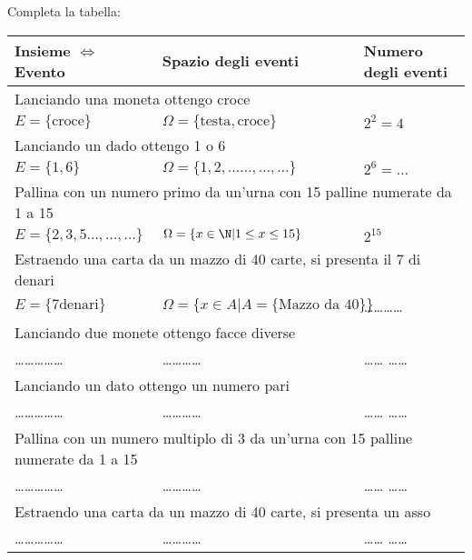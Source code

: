 \begin{esercizio}
 \label{ese:9.3}
Completa la tabella:
\begin{center}
\begin{tabular}{lll}
Insieme \(\Leftrightarrow\) Evento & Spazio degli eventi & Numero degli eventi\\
\midrule
\multicolumn{3}{l}{Lanciando una moneta ottengo croce}\\
\( E=\{\text{croce}\} \) & \( \Omega =\{\text{testa},\text{croce}\} \) & \( 2^2=4 \)\\
\midrule
\multicolumn{3}{l}{Lanciando un dado ottengo 1 o 6} \\
\( E=\{1,6\} \) & \( \Omega =\{1,2,\ldots \ldots, \ldots, \ldots\} \) & \( 2^6=\ldots 
\)\\
\midrule
\multicolumn{3}{l}{Pallina con un numero primo da un'urna con 15 palline 
numerate da 1 a 15}\\
\( E=\{2,3,5\ldots,\ldots,\ldots\} \) & \( \Omega =\{x\in \N| 1\le x\le 15\} 
\) & 
\( 2^{15} \)\\
\midrule
\multicolumn{3}{l}{Estraendo una carta da un mazzo di 40 carte, si presenta il 7 
di denari}\\
\( E=\{7\text{denari}\} \) & \( \Omega =\{x\in A| A=\{\text{Mazzo da 40}\}\} \) & 
\ldots\ldots\ldots\ldots\\
\midrule
\multicolumn{3}{l}{Lanciando due monete ottengo facce diverse}\\
\ldots \ldots \ldots \ldots \ldots & \ldots \ldots \ldots \ldots & \ldots \ldots 
\ldots \ldots\\
\midrule
\multicolumn{3}{l}{Lanciando un dato ottengo un numero pari}\\
\ldots \ldots \ldots \ldots \ldots & \ldots \ldots \ldots \ldots & \ldots \ldots 
\ldots \ldots\\
\midrule
\multicolumn{3}{l}{Pallina con un numero multiplo di 3 da un'urna con 15 palline 
numerate da 1 a 15}\\
\ldots \ldots \ldots \ldots \ldots & \ldots \ldots \ldots \ldots & \ldots \ldots 
\ldots \ldots\\
\midrule
\multicolumn{3}{l}{Estraendo una carta da un mazzo di 40 carte, si presenta un 
asso}\\
\ldots \ldots \ldots \ldots \ldots & \ldots \ldots \ldots \ldots & \ldots \ldots 
\ldots \ldots\\
\end{tabular}
\end{center}
\end{esercizio}
